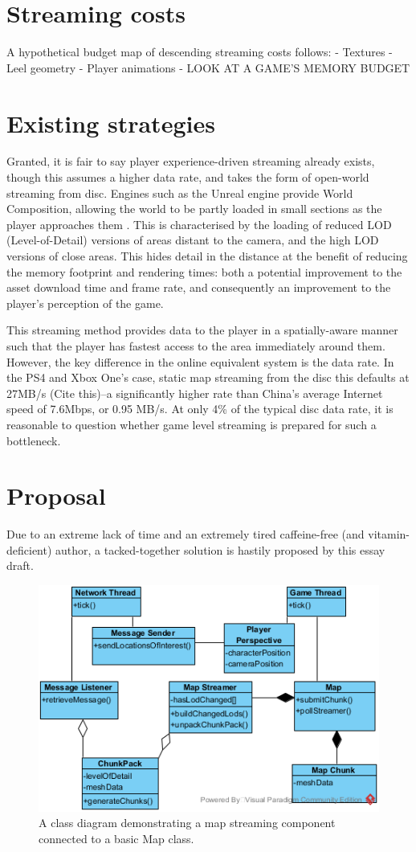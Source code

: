 \documentclass{scrartcl}
\begin{document}
\section{Streaming costs}
A hypothetical budget map of descending streaming costs follows:
- Textures
- Leel geometry
- Player animations
- LOOK AT A GAME'S MEMORY BUDGET

\section{Existing strategies}
Granted, it is fair to say player experience-driven streaming already exists, though this assumes a higher data rate, and takes the form of open-world streaming from disc. Engines such as the Unreal engine provide World Composition, allowing the world to be partly loaded in small sections as the player approaches them \cite{unrealcomposition}. This is characterised by the loading of reduced LOD (Level-of-Detail) versions of areas distant to the camera, and the high LOD versions of close areas. This hides detail in the distance at the benefit of reducing the memory footprint and rendering times: both a potential improvement to the asset download time and frame rate, and consequently an improvement to the player's perception of the game.

This streaming method provides data to the player in a spatially-aware manner such that the player has fastest access to the area immediately around them. However, the key difference in the online equivalent system is the data rate. In the PS4 and Xbox One's case, static map streaming from the disc this defaults at 27MB/s (Cite this)--a significantly higher rate than China's average Internet speed of 7.6Mbps, or 0.95 MB/s. At only 4\% of the typical disc data rate, it is reasonable to question whether game level streaming is prepared for such a bottleneck.

\section{Proposal}
Due to an extreme lack of time and an extremely tired caffeine-free (and vitamin-deficient) author, a tacked-together solution is hastily proposed by this essay draft.

\begin{figure}
	\includegraphics[width=0.7\linewidth]{Basic_Map_Streamer}
	\caption{A class diagram demonstrating a map streaming component connected to a basic Map class.}
	\label{fig:simplesystem}
\end{figure}
\end{document}
